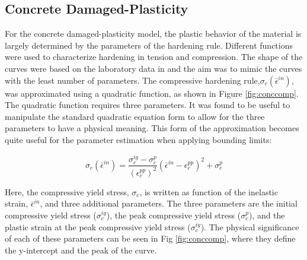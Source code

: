 \subsection{Concrete Damaged-Plasticity}

For the concrete damaged-plasticity model, the plastic behavior of the material is largely determined by the
parameters of the hardening rule. Different functions were used
to characterize hardening in tension and compression. The shape of
the curves were based on the laboratory data in \citet{wahalathantri_material_2011} and the aim was to mimic the curves with the least number of
parameters. The compressive hardening rule,$\sigma_{c}\left(\bar{\epsilon}^{in}\right)$,
was approximated using a quadratic function, as shown in Figure \ref{fig:conccomp}. The
quadratic function requires three parameters. It was found to be useful
to manipulate the standard quadratic equation form to allow for the
three parameters to have a physical meaning. This form of the approximation
becomes quite useful for the parameter estimation when applying bounding
limits:

\begin{equation}
\sigma_{c}\left(\bar{\epsilon}^{in}\right)=\frac{\sigma_{c}^{iy}-\sigma_{c}^{p}}{\left(\epsilon_{c}^{pp}\right)^{2}}\left(\bar{\epsilon}^{in}-\epsilon_{c}^{pp}\right)^{2}+\sigma_{c}^{p}\label{eqn:param2-1}
\end{equation}

Here, the compressive yield stress, $\sigma_{c}$, is written as function
of the inelastic strain, $\bar{\epsilon}^{in}$, and three additional
parameters. The three parameters are the initial compressive yield
stress ($\sigma_{c}^{iy}$), the peak compressive yield stress ($\sigma_{c}^{p}$),
and the plastic strain at the peak compressive yield stress ($\sigma_{c}^{iy}$).
The physical significance of each of these parameters can be seen
in Fig \ref{fig:conccomp}, where they define the y-intercept and the peak of the curve.

